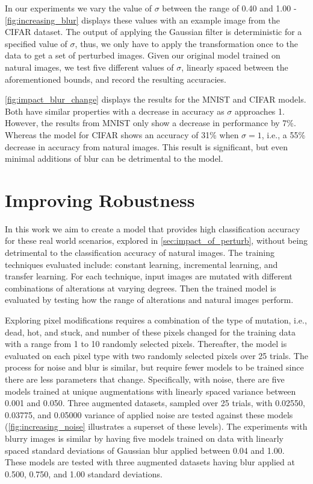 \documentclass[conference]{IEEEtran}
\begin{document}
In our experiments we vary the value of $\sigma$ between the range of 0.40 and 1.00 - \autoref{fig:increasing_blur} displays these values with an example image from the CIFAR dataset. The output of applying the Gaussian filter is deterministic for a specified value of $\sigma$, thus, we only have to apply the transformation once to the data to get a set of perturbed images. Given our original model trained on natural images, we test five different values of $\sigma$, linearly spaced between the aforementioned bounds, and record the resulting accuracies.

\autoref{fig:impact_blur_change} displays the results for the MNIST and CIFAR models. Both have similar properties with a decrease in accuracy as $\sigma$ approaches 1. However, the results from MNIST only show a decrease in performance by 7\%. Whereas the model for CIFAR shows an accuracy of 31\% when $\sigma=1$, i.e., a 55\% decrease in accuracy from natural images. This result is significant, but even minimal additions of blur can be detrimental to the model.

\section{Improving Robustness}
\label{sec:improving_robustness}

In this work we aim to create a model that provides high classification accuracy for these real world scenarios, explored in \autoref{sec:impact_of_perturb}, without being detrimental to the classification accuracy of natural images. The training techniques evaluated include: constant learning, incremental learning, and transfer learning. For each technique, input images are mutated with different combinations of alterations at varying degrees. Then the trained model is evaluated by testing how the range of alterations and natural images perform.

Exploring pixel modifications requires a combination of the type of mutation, i.e., dead, hot, and stuck, and number of these pixels changed for the training data with a range from 1 to 10 randomly selected pixels. Thereafter, the model is evaluated on each pixel type with two randomly selected pixels over 25 trials. The process for noise and blur is similar, but require fewer models to be trained since there are less parameters that change. Specifically, with noise, there are five models trained at unique augmentations with linearly spaced variance between 0.001 and 0.050. Three augmented datasets, sampled over 25 trials, with 0.02550, 0.03775, and 0.05000 variance of applied noise are tested against these models (\autoref{fig:increasing_noise} illustrates a superset of these levels). The experiments with blurry images is similar by having five models trained on data with linearly spaced standard deviations of Gaussian blur applied between 0.04 and 1.00. These models are tested with three augmented datasets having blur applied at 0.500, 0.750, and 1.00 standard deviations.
\end{document}
